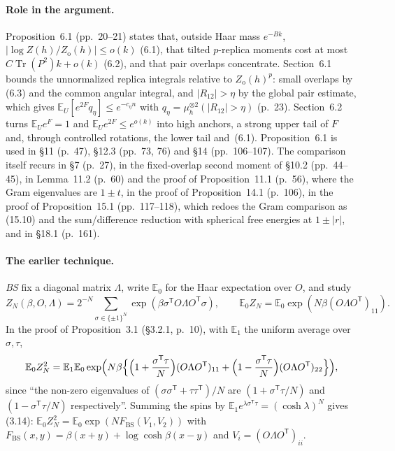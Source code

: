 \documentclass[11pt]{article}
\newcommand{\E}{\mathbb{E}}
\DeclareMathOperator{\Tr}{Tr}
\newcommand{\ploc}[2]{#1}
\newcommand{\sloc}[2]{\cite[#2]{#1}}
\begin{document}
\paragraph{Role in the argument.}
\ploc{Proposition~6.1 (pp.~20--21)}{profile-spectral.tex:666--707} states
that, outside Haar mass $e^{-Bk}$, $|\log Z(h)/Z_{\mathrm o}(h)|\le o(k)$
\ploc{(6.1)}{profile-spectral.tex:674--677}, that tilted $p$-replica moments
cost at most $C\Tr(P^2)k+o(k)$ \ploc{(6.2)}{profile-spectral.tex:680--687},
and that pair overlaps concentrate. Section~6.1 bounds the unnormalized
replica integrals relative to $Z_{\mathrm o}(h)^p$: small overlaps by (6.3)
and the common angular integral, and $|R_{12}|>\eta$ by the global pair
estimate, which gives $\E_U[e^{2F}q_\eta]\le e^{-c_\eta n}$ with
$q_\eta=\mu_h^{\otimes2}(|R_{12}|>\eta)$
\ploc{(p.~23)}{profile-spectral.tex:865--867}. Section~6.2 turns
$\E_Ue^F=1$ and $\E_Ue^{2F}\le e^{o(k)}$ into high anchors, a strong upper
tail of $F$ and, through controlled rotations, the lower tail and~(6.1).
Proposition~6.1 is used in \ploc{\S11 (p.~47)}{profile-local.tex:76},
\ploc{\S12.3 (pp.~73, 76)}{profile-amplification.tex:570, 835} and
\ploc{\S14 (pp.~106--107)}{profile-entropy.tex:187, 211, 288}. The
comparison itself recurs in \ploc{\S7 (p.~27)}{profile-spectral.tex:1176--1180},
in the fixed-overlap second moment of
\ploc{\S10.2 (pp.~44--45)}{profile-orbits.tex:144--148, 163--235}, in
\ploc{Lemma~11.2 (p.~60)}{profile-local.tex:799--936} and
\ploc{the proof of Proposition~11.1 (p.~56)}{profile-local.tex:512}, where
the Gram eigenvalues are $1\pm t$, in
\ploc{the proof of Proposition~14.1 (p.~106)}{profile-entropy.tex:198--204},
in \ploc{the proof of Proposition~15.1 (pp.~117--118)}{cap-static.tex:345--409},
which redoes the Gram comparison as (15.10) and the sum/difference reduction
with spherical free energies at $1\pm|r|$, and in
\ploc{\S18.1 (p.~161)}{cap-initialization.tex:257--271, 293--297}.

\paragraph{The earlier technique.}
\emph{BS} \sloc{BhattacharyaSen2015-OrthogonalMeanFieldSpinGlasses}{(1.16)--(1.17),
p.~5} fix a diagonal matrix $\Lambda$, write $\E_0$ for the Haar expectation
over $O$, and study
\[
 Z_N(\beta,O,\Lambda)=2^{-N}\sum_{\sigma\in\{\pm1\}^N}
 \exp(\beta\sigma^{\mathsf T}O\Lambda O^{\mathsf T}\sigma),\qquad
 \E_0Z_N=\E_0\exp(N\beta(O\Lambda O^{\mathsf T})_{11}).
\]
In the proof of Proposition~3.1 (\S3.2.1, p.~10), with $\E_1$ the uniform
average over $\sigma,\tau$,
\[
 \E_0Z_N^2=\E_1\E_0\exp\Bigl(N\beta\Bigl\{\Bigl(1+\frac{\sigma^{\mathsf T}\tau}{N}\Bigr)
 (O\Lambda O^{\mathsf T})_{11}+\Bigl(1-\frac{\sigma^{\mathsf T}\tau}{N}\Bigr)
 (O\Lambda O^{\mathsf T})_{22}\Bigr\}\Bigr),
\]
since ``the non-zero eigenvalues of
$(\sigma\sigma^{\mathsf T}+\tau\tau^{\mathsf T})/N$ are
$(1+\sigma^{\mathsf T}\tau/N)$ and $(1-\sigma^{\mathsf T}\tau/N)$
respectively''. Summing the spins by
$\E_1e^{\lambda\sigma^{\mathsf T}\tau}=(\cosh\lambda)^N$ gives (3.14):
$\E_0Z_N^2=\E_0\exp(NF_{\mathrm{BS}}(V_1,V_2))$ with
$F_{\mathrm{BS}}(x,y)=\beta(x+y)+\log\cosh\beta(x-y)$ and
$V_i=(O\Lambda O^{\mathsf T})_{ii}$.
\end{document}
